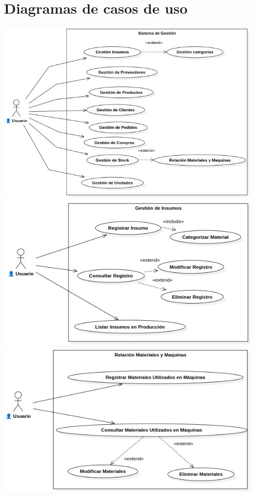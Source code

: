 \documentclass{article}
\begin{document}
\section{Diagramas de casos de uso}
	\begin{center}
		\includegraphics[width=1\linewidth]{imagenes/cu_sistema_de_gestion.png}
		\includegraphics[width=1\linewidth]{imagenes/cu_gestion_de_insumos.png}
		\includegraphics[width=1\linewidth]{imagenes/cu_relacion_materiales_maquinas.png}
	\end{center}
\end{document}
